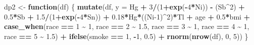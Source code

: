 \documentclass[12pt, twoside]{amherstthesis}
\newenvironment{Shaded}{\begin{snugshade}}{\end{snugshade}}
\newcommand{\AttributeTok}[1]{\textcolor[rgb]{0.13,0.29,0.53}{#1}}
\newcommand{\ControlFlowTok}[1]{\textcolor[rgb]{0.13,0.29,0.53}{\textbf{#1}}}
\newcommand{\DecValTok}[1]{\textcolor[rgb]{0.00,0.00,0.81}{#1}}
\newcommand{\FloatTok}[1]{\textcolor[rgb]{0.00,0.00,0.81}{#1}}
\newcommand{\FunctionTok}[1]{\textcolor[rgb]{0.13,0.29,0.53}{\textbf{#1}}}
\newcommand{\NormalTok}[1]{#1}
\newcommand{\OtherTok}[1]{\textcolor[rgb]{0.56,0.35,0.01}{#1}}
\newcommand{\SpecialCharTok}[1]{\textcolor[rgb]{0.81,0.36,0.00}{\textbf{#1}}}
\begin{document}
\begin{Shaded}
\begin{Highlighting}[]
\NormalTok{dp2 }\OtherTok{\textless{}{-}} \ControlFlowTok{function}\NormalTok{(df) \{}
  \FunctionTok{mutate}\NormalTok{(df, }\AttributeTok{y =} 
\NormalTok{           Hg }\SpecialCharTok{+} \DecValTok{3}\SpecialCharTok{/}\NormalTok{(}\DecValTok{1}\SpecialCharTok{+}\FunctionTok{exp}\NormalTok{(}\SpecialCharTok{{-}}\DecValTok{4}\SpecialCharTok{*}\NormalTok{Ni)) }\SpecialCharTok{{-}}\NormalTok{ (Sb}\SpecialCharTok{\^{}}\DecValTok{2}\NormalTok{) }\SpecialCharTok{+} \FloatTok{0.5}\SpecialCharTok{*}\NormalTok{Sb }\SpecialCharTok{+} \FloatTok{1.5}\SpecialCharTok{/}\NormalTok{(}\DecValTok{1}\SpecialCharTok{+}\FunctionTok{exp}\NormalTok{(}\SpecialCharTok{{-}}\DecValTok{4}\SpecialCharTok{*}\NormalTok{Sn)) }\SpecialCharTok{+} 
           \FloatTok{0.18}\SpecialCharTok{*}\NormalTok{Hg}\SpecialCharTok{*}\NormalTok{((Ni}\DecValTok{{-}1}\NormalTok{)}\SpecialCharTok{\^{}}\DecValTok{2}\NormalTok{)}\SpecialCharTok{*}\NormalTok{Tl }\SpecialCharTok{+}
\NormalTok{           age }\SpecialCharTok{+} \FloatTok{0.5}\SpecialCharTok{*}\NormalTok{bmi }\SpecialCharTok{+} 
           \FunctionTok{case\_when}\NormalTok{(race }\SpecialCharTok{==} \DecValTok{1} \SpecialCharTok{\textasciitilde{}} \DecValTok{1}\NormalTok{, }
\NormalTok{                     race }\SpecialCharTok{==} \DecValTok{2} \SpecialCharTok{\textasciitilde{}} \FloatTok{1.5}\NormalTok{, }
\NormalTok{                     race }\SpecialCharTok{==} \DecValTok{3} \SpecialCharTok{\textasciitilde{}} \DecValTok{1}\NormalTok{, }
\NormalTok{                     race }\SpecialCharTok{==} \DecValTok{4} \SpecialCharTok{\textasciitilde{}} \DecValTok{1}\NormalTok{, }
\NormalTok{                     race }\SpecialCharTok{==} \DecValTok{5} \SpecialCharTok{\textasciitilde{}} \FloatTok{1.5}\NormalTok{) }\SpecialCharTok{+}
           \FunctionTok{ifelse}\NormalTok{(smoke }\SpecialCharTok{==} \DecValTok{1}\NormalTok{, }\SpecialCharTok{{-}}\DecValTok{1}\NormalTok{, }\FloatTok{0.5}\NormalTok{) }\SpecialCharTok{+}
           \FunctionTok{rnorm}\NormalTok{(}\FunctionTok{nrow}\NormalTok{(df), }\DecValTok{0}\NormalTok{, }\DecValTok{5}\NormalTok{))}
\NormalTok{\}}
\end{Highlighting}
\end{Shaded}
\end{document}

